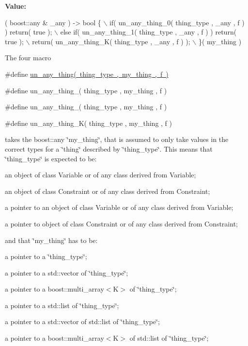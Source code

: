 {\bfseries Value\+:}
\begin{DoxyCode}
[&]( boost::any & \_any ) -> \textcolor{keywordtype}{bool} \{ \(\backslash\)
  if( un\_any\_thing\_0( thing\_type , \_any , f ) ) \textcolor{keywordflow}{return}( \textcolor{keyword}{true} ); \(\backslash\)
  else \textcolor{keywordflow}{if}( un\_any\_thing\_1( thing\_type , \_any , f ) ) \textcolor{keywordflow}{return}( \textcolor{keyword}{true} ); \(\backslash\)
  return( un\_any\_thing\_K( thing\_type , \_any , f ) ); \(\backslash\)
  \}( my\_thing )
\end{DoxyCode}
The four macro

\#define \mbox{\hyperlink{group__boost__any__stuff_gab299af634bc1ca9be3a8d45a14560036}{un\+\_\+any\+\_\+thing( thing\+\_\+type , my\+\_\+thing , f )}}

\#define un\+\_\+any\+\_\+thing\+\_( thing\+\_\+type , my\+\_\+thing , f )

\#define un\+\_\+any\+\_\+thing\+\_( thing\+\_\+type , my\+\_\+thing , f )

\#define un\+\_\+any\+\_\+thing\+\_\+\+K( thing\+\_\+type , my\+\_\+thing , f )

takes the boost\+::any \char`\"{}my\+\_\+thing\char`\"{}, that is assumed to only take values in the correct types for a \char`\"{}thing\char`\"{} described by \char`\"{}thing\+\_\+type\char`\"{}. This means that \char`\"{}thing\+\_\+type\char`\"{} is expected to be\+:


\begin{DoxyItemize}
\item an object of class Variable or of any class derived from Variable;
\item an object of class Constraint or of any class derived from Constraint;
\item a pointer to an object of class Variable or of any class derived from Variable;
\item a pointer to object of class Constraint or of any class derived from Constraint;
\end{DoxyItemize}

and that \char`\"{}my\+\_\+thing\char`\"{} has to be\+:


\begin{DoxyItemize}
\item a pointer to a \char`\"{}thing\+\_\+type\char`\"{};
\item a pointer to a std\+::vector of \char`\"{}thing\+\_\+type\char`\"{};
\item a pointer to a boost\+::multi\+\_\+array$<$\+K$>$ of \char`\"{}thing\+\_\+type\char`\"{};
\item a pointer to a std\+::list of \char`\"{}thing\+\_\+type\char`\"{};
\item a pointer to a std\+::vector of std\+::list of \char`\"{}thing\+\_\+type\char`\"{};
\item a pointer to a boost\+::multi\+\_\+array$<$\+K$>$ of std\+::list of \char`\"{}thing\+\_\+type\char`\"{};
\end{DoxyItemize}

